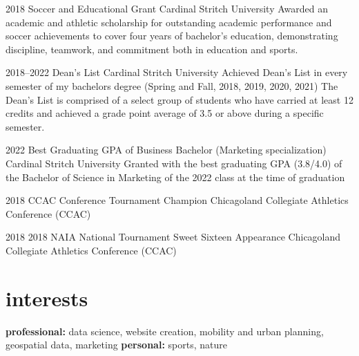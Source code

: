 \documentclass[]{friggeri-cv-a4}
\begin{document}
\begin{entrylist}


\entry
{2018}
{Soccer and Educational Grant}
{Cardinal Stritch University}
{Awarded an academic and athletic scholarship for outstanding academic performance and soccer achievements to cover four years of bachelor's education, demonstrating discipline, teamwork, and commitment both in education and sports.}


\entry
{2018--2022}
{Dean's List}
{Cardinal Stritch University}
{Achieved Dean's List in every semester of my bachelors degree (Spring and Fall, 2018, 2019, 2020, 2021)
The Dean's List is comprised of a select group of students who have carried at least 12 credits and achieved a grade point average of
3.5 or above during a specific semester.}


\entry
{2022}
{Best Graduating GPA of Business Bachelor (Marketing specialization)}
{Cardinal Stritch University}
{Granted with the best graduating GPA (3.8/4.0) of the Bachelor of Science in Marketing of the 2022 class at the time of graduation}


\entry
{2018}
{CCAC Conference Tournament Champion}
{Chicagoland Collegiate Athletics Conference (CCAC)}


\entry
{2018}
{2018 NAIA National Tournament Sweet Sixteen Appearance}
{Chicagoland Collegiate Athletics Conference (CCAC)}



\end{entrylist}




\section{interests}

\textbf{professional:} data science, website creation, mobility and urban planning, geospatial data, marketing \textbf{personal:} sports, nature 


\end{document}
